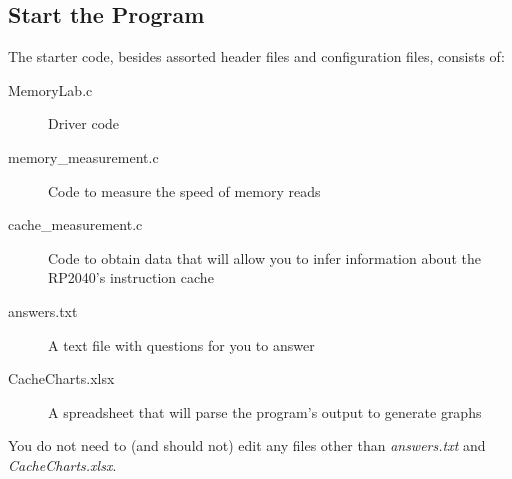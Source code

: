 



\subsection{Start the Program}

The starter code, besides assorted header files and configuration files, consists of:
\begin{description}
    \item[MemoryLab.c] Driver code
    \item[memory\_measurement.c] Code to measure the speed of memory reads
    \item[cache\_measurement.c] Code to obtain data that will allow you to infer information about the RP2040's instruction cache
    \item[answers.txt] A text file with questions for you to answer
    \item[CacheCharts.xlsx] A spreadsheet that will parse the program's output to generate graphs
\end{description}

You do not need to (and should not) edit any files other than \textit{answers.txt} and \textit{CacheCharts.xlsx}.

\begin{description}
\end{description}

%

